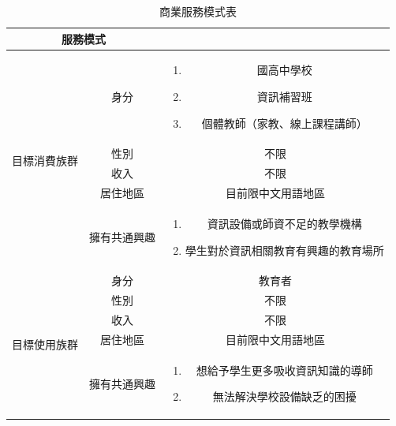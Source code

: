 \begin{table}[H]
  \centering
  \caption[商業服務模式表]{商業服務模式表}
  \renewcommand{\arraystretch}{1.1} %
  \begin{tabular}{|c|c|c|}
    \hline
    \multicolumn{2}{|c|}{服務模式} & \\
    \hline
    \multirow{5}{*}[-0.5ex]{目標消費族群} & 身分 & 
    \begin{minipage}[c]{0.5\columnwidth}
      \begin{enumerate}[label=(\arabic*)]
        \setlength{\parindent}{1em}
        \item 國高中學校
        \item 資訊補習班
        \item 個體教師（家教、線上課程講師）
      \end{enumerate}
    \end{minipage} \\
    \cline{2-3}
    ~ & 性別 & 不限 \\
    \cline{2-3}
    ~ & 收入 & 不限 \\
    \cline{2-3}
    ~ & 居住地區 & 目前限中文用語地區 \\
    \cline{2-3}
    ~ & 擁有共通興趣 &
    \begin{minipage}[c]{0.5\columnwidth}
      \begin{enumerate}[label=(\arabic*)]
        \setlength{\parindent}{1em}
        \item 資訊設備或師資不足的教學機構
        \item 學生對於資訊相關教育有興趣的教育場所
      \end{enumerate}
    \end{minipage} \\
    \hline
    \multirow{5}{*}[-0.5ex]{目標使用族群} & 身分 & 教育者 \\
    \cline{2-3}
    ~ & 性別 & 不限 \\
    \cline{2-3}
    ~ & 收入 & 不限 \\
    \cline{2-3}
    ~ & 居住地區 & 目前限中文用語地區 \\
    \cline{2-3}
    ~ & 擁有共通興趣 & 
      \begin{minipage}[c]{0.5\columnwidth}
        \begin{enumerate}[label=(\arabic*)]
          \setlength{\parindent}{2em}
          \item 想給予學生更多吸收資訊知識的導師
          \item 無法解決學校設備缺乏的困擾
        \end{enumerate}
      \end{minipage} \\
    \hline
  \end{tabular}
\end{table}
\newpage
